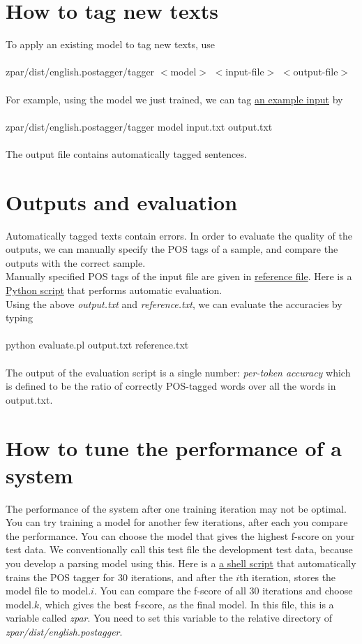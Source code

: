 \documentclass[12pt]{article}
\begin{document}
\begin{CJK}{GBK}{song}
\section{How to tag new texts}
To apply an existing model to tag new texts, use
\\
\\
\hspace{3cm} zpar/dist/english.postagger/tagger $<$model$>$ $<$input-file$>$ $<$output-file$>$
\\
\\
For example, using the model we just trained, we can tag \href{eng_pos_files/input.txt}{an example input} by
\\
\\
\hspace{3cm} zpar/dist/english.postagger/tagger model input.txt output.txt
\\
\\
The output file contains automatically tagged sentences.
\section{Outputs and evaluation}
Automatically tagged texts contain errors. In order to evaluate the quality of the outputs, we can manually specify the POS tags of a sample, and compare the outputs with the correct sample.
\\
Manually specified POS tags of the input file are given in \href{eng_pos_files/reference.txt}{reference file}. Here is a \href{eng_pos_files/evaluate.py}{Python script} that performs automatic evaluation.
\\
Using the above \textit{output.txt} and \textit{reference.txt}, we can evaluate the accuracies by typing
\\
\\
\hspace{3cm} python evaluate.pl output.txt reference.txt
\\
\\
The output of the evaluation script is a single number: \textit{per-token accuracy} which is defined to be the ratio of correctly POS-tagged words over all the words in output.txt.
\section{How to tune the performance of a system}
The performance of the system after one training iteration may not be optimal. You can try training a model for another few iterations, after each you compare the performance. You can choose the model that gives the highest f-score on your test data. We conventionally call this test file the development test data, because you develop a parsing model using this. Here is a \href{eng_pos_files/test.sh}{a shell script} that automatically trains the POS tagger for 30 iterations, and after the $i$th iteration, stores the model file to model.$i$. You can compare the f-score of all 30 iterations and choose model.$k$, which gives the best f-score, as the final model. In this file, this is a variable called \textit{zpar}. You need to set this variable to the relative directory of \textit{zpar/dist/english.postagger}.
\end{CJK}
\end{document}
